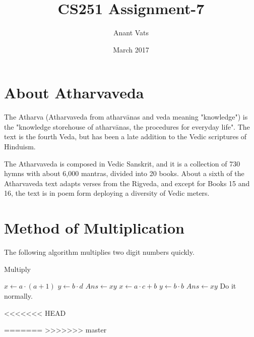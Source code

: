 \documentclass{article}
\title{CS251 Assignment-7}
\author{Anant Vats }
\date{March 2017}
\begin{document}
\maketitle
\section{About Atharvaveda}
The Atharva (Atharvaveda from atharvānas and veda meaning "knowledge") is the "knowledge storehouse of atharvānas, the procedures for everyday life". The text is the fourth Veda, but has been a late addition to the Vedic scriptures of Hinduism.\cite{wikicite1}

The Atharvaveda is composed in Vedic Sanskrit, and it is a collection of 730 hymns with about 6,000 mantras, divided into 20 books. About a sixth of the Atharvaveda text adapts verses from the Rigveda, and except for Books 15 and 16, the text is in poem form deploying a diversity of Vedic meters.\cite{wikicite1} 

\section{Method of Multiplication}
The following algorithm multiplies two digit numbers quickly.
\begin{algorithm}
\caption{Multiply}\label{Merge}
\begin{algorithmic}[1]
  
\State $x\gets a\cdot (a+1)$
\State $y\gets b\cdot d$
\State $Ans\gets xy$
\EndIf
{} 
\State $x\gets a\cdot c+b$
\State$y\gets b\cdot b$
\State$Ans\gets xy$
\Else
\State Do it normally.
\EndIf
\EndProcedure
\Statex

\end{algorithmic}
\end{algorithm}

<<<<<<< HEAD

=======
>>>>>>> master
\end{document}
